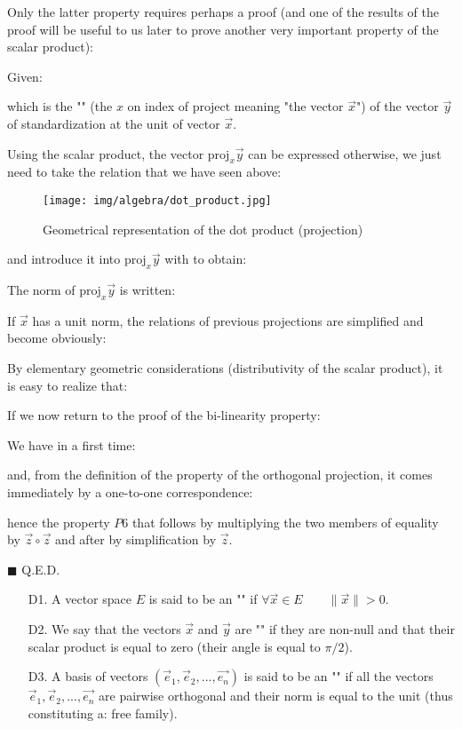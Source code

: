 	Only the latter property requires perhaps a proof (and one of the results of the proof  will be useful to us later to prove another very important property of the scalar product):
	\begin{dem}
	Given:
	
	which is the "\label{orthogonal projection vector}" (the $x$ on index of $\text{project}$ meaning "the vector $\vec{x}$") of the vector $\vec{y}$ of standardization at the unit of vector $\vec{x}$.
	
	Using the scalar product, the vector $\text{proj}_x\vec{y}$ can be expressed otherwise, we just need to take the relation that we have seen above:
	\begin{figure}[H]
		\centering
		\texttt{[image: img/algebra/dot\_product.jpg]}
		\caption{Geometrical representation of the dot product (projection)}
	\end{figure}
	
	and introduce it into $\text{proj}_x\vec{y}$ with to obtain:
	
	The norm of $\text{proj}_x\vec{y}$ is written:
	
	If $\vec{x}$ has a unit norm, the relations of previous projections are simplified and become obviously:
	
	By elementary geometric considerations (distributivity of the scalar product), it is easy to realize that:
	
	If we now return to the proof of the bi-linearity property:
	
	We have in a first time:
	
	and, from the definition of the property of the orthogonal projection, it comes immediately by a one-to-one correspondence:
	
	hence the property $P6$ that follows by multiplying the two members of equality by $\vec{z}\circ\vec{z}$ and after by simplification by $\vec{z}$.
	\begin{flushright}
		$\blacksquare$  Q.E.D.
	\end{flushright}
	\end{dem}
	\begin{enumerate}
		\item[D1.] A vector space $E$ is said to be an "" if $\forall \vec{x} \in E \qquad \|\vec{x}\|>0$.
		
		\item[D2.] We say that the vectors $\vec{x}$ and $\vec{y}$ are "" if they are non-null and that their scalar product is equal to zero (their angle is equal to $\pi/2$).
		
		\item[D3.] A basis of vectors $(\vec{e}_1,\vec{e}_2,...,\vec{e_n})$ is said to be an "" if all the vectors $\vec{e}_1,\vec{e}_2,...,\vec{e_n}$ are pairwise orthogonal and their norm is equal to the unit (thus constituting a: free family).
	\end{enumerate}
